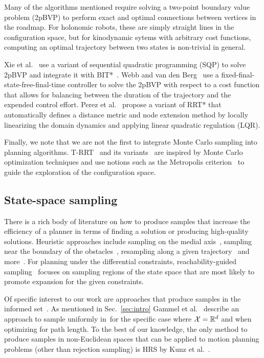 \documentclass[letterpaper, 10 pt, conference]{ieeeconf}  %
\begin{document}
Many of the algorithms mentioned require solving a two-point boundary value problem (2pBVP) to perform exact and optimal connections between vertices in the roadmap.
For holonomic robots, these are simply straight lines in the configuration space, but for kinodynamic sytems with arbitrary cost functions,  computing an optimal trajectory between two states is non-trivial in general.

Xie et al.~\cite{XBPA15} use a variant of sequential quadratic programming (SQP) to solve 2pBVP and integrate it with BIT*~\cite{GSB15}.
Webb and van den Berg~\cite{WB13} use a fixed-final-state-free-final-time controller to solve the 2pBVP  with respect to a cost function that allows for balancing between the duration of the trajectory and the expended control effort.
Perez et al.~\cite{PPKKL12} propose a variant of RRT* that automatically defines a distance metric and node extension method by locally linearizing
the domain dynamics and applying linear quadratic regulation (LQR).

Finally, we note that we are not the first to integrate Monte Carlo sampling into planning algorithms. 
T-RRT~\cite{JCS10} and its variants~\cite{DSC13} are inspired by Monte Carlo optimization techniques and use notions such as the Metropolis criterion~\cite{CG95} to guide the exploration of the configuration space.


\subsection{State-space sampling}
\label{subsec:sampling}
There is a rich body of literature on how to produce samples that increase the efficiency of a planner in terms of finding a solution or producing high-quality solutions.
Heuristic approaches include
sampling on the medial axis~\cite{WAS99a, YDLTA14},
sampling near the boundary of the obstacles~\cite{YTEA12},
resampling along a given trajectory~\cite{AS11}
and more~\cite{US03, SWT09}.
For planning under the differential constraints,
reachability-guided sampling~\cite{PLAEFRA17} focuses on sampling regions of the state space that are most likely to promote expansion for the given constraints.

Of specific interest to our work are approaches that produce samples in the informed set~\Cinf.
As mentioned in Sec.~\ref{sec:intro} Gammel et al.~\cite{GSB14} describe an approach to sample uniformly in~\Cinf for the specific case where $\mathcal{X} = \mathbb{R}^d$ and when optimizing for path length.
To the best of our knowledge, the only method to produce samples in non-Euclidean spaces that can be  applied to motion planning problems (other than rejection sampling) is HRS by Kunz et al.~\cite{KTC16}.
\end{document}
